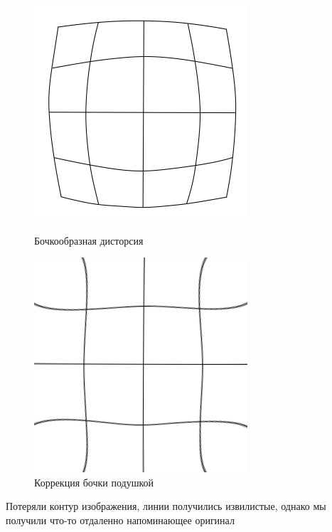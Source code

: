 \documentclass[a4paper, 16pt]{article}
\begin{document}
\newpage
\begin{figure}[!htb]
    \centering
    \begin{minipage}{0.45\textwidth}
        \centering
        \includegraphics{barbarrel.png}
        \captionsetup{skip=0pt}
        \caption{Бочкообразная дисторсия}
        \label{Рис:18}
    \end{minipage}
    \begin{minipage}{0.45\textwidth}
        \centering
        \includegraphics[scale=0.5]{undistort_bar.png}
        \captionsetup{skip=0pt}
        \caption{Коррекция бочки подушкой}
        \label{Рис:19}
    \end{minipage}
\end{figure}


\noindent Потеряли контур изображения, линии получились извилистые,
однако мы получили что-то отдаленно напоминающее оригинал
\end{document}
